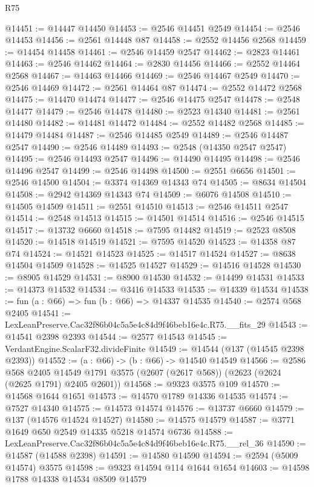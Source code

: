 \begin{lexlean}{R75}
\begin{coremodule}
@14451 := @14447 @14450
@14453 := @2546 @14451 @2549
@14454 := @2546 @14453
@14456 := @2561 @14448 @87
@14458 := @2552 @14456 @2568
@14459 := @14454 @14458
@14461 := @2546 @14459 @2547
@14462 := @2823 @14461
@14463 := @2546 @14462
@14464 := @2830 @14456
@14466 := @2552 @14464 @2568
@14467 := @14463 @14466
@14469 := @2546 @14467 @2549
@14470 := @2546 @14469
@14472 := @2561 @14464 @87
@14474 := @2552 @14472 @2568
@14475 := @14470 @14474
@14477 := @2546 @14475 @2547
@14478 := @2548 @14477
@14479 := @2546 @14478
@14480 := @2523 @14340
@14481 := @2561 @14480
@14482 := @14481 @14472
@14484 := @2552 @14482 @2568
@14485 := @14479 @14484
@14487 := @2546 @14485 @2549
@14489 := @2546 @14487 @2547
@14490 := @2546 @14489
@14493 := @2548 (@14350 @2547 @2547)
@14495 := @2546 @14493 @2547
@14496 := @14490 @14495
@14498 := @2546 @14496 @2547
@14499 := @2546 @14498
@14500 := @2551 @6656
@14501 := @2546 @14500
@14504 := @3374 @14369 @14343 @74
@14505 := @8634 @14504
@14508 := @2942 @14369 @14343 @74
@14509 := @6076 @14508
@14510 := @14505 @14509
@14511 := @2551 @14510
@14513 := @2546 @14511 @2547
@14514 := @2548 @14513
@14515 := @14501 @14514
@14516 := @2546 @14515
@14517 := @13732 @6660
@14518 := @7595 @14482
@14519 := @2523 @8508
@14520 := @14518 @14519
@14521 := @7595 @14520
@14523 := @14358 @87 @74
@14524 := @14521 @14523
@14525 := @14517 @14524
@14527 := @8638 @14504 @14509
@14528 := @14525 @14527
@14529 := @14516 @14528
@14530 := @8905 @14529
@14531 := @8900 @14530
@14532 := @14499 @14531
@14533 := @14373 @14532
@14534 := @3416 @14533
@14535 := @14339 @14534
@14538 := fun (a : @66) => fun (b : @66) => @14337 @14535
@14540 := @2574 @568 @2405
@14541 := LexLeanPreserve.Cac32f86b04c5a5e4c84d9f46beb16e4c.R75.__fits_29
@14543 := @14541 @2398 @2393
@14544 := @2577 @14543
@14545 := VerdantEngine.ScalarF32.divideFinite
@14549 := @14544 (@137 (@14545 @2398 @2393))
@14552 := (a : @66) -> (b : @66) -> @14540 @14549
@14566 := @2586
    @568
    @2405
    @14549
    @1791
    @3575
    (@2607 (@2617 @568))
    (@2623 (@2624 (@2625 @1791) @2405 @2601))
@14568 := @9323 @3575 @109
@14570 := @14568 @1644 @1651
@14573 := @14570 @1789 @14336 @14535
@14574 := @7527 @14340
@14575 := @14573 @14574
@14576 := @13737 @6660
@14579 := @137 (@14576 @14524 @14527)
@14580 := @14575 @14579
@14587 := @3771 @1649 @650 @2549 @14335 @5218 @14574 @6736
@14588 := LexLeanPreserve.Cac32f86b04c5a5e4c84d9f46beb16e4c.R75.__rel_36
@14590 := @14587 (@14588 @2398)
@14591 := @14580 @14590
@14594 := @2594 (@5009 @14574) @3575
@14598 := @9323 @14594 @114 @1644 @1654
@14603 := @14598 @1788 @14338 @14534 @8509 @14579

\end{coremodule}
\end{lexlean}

